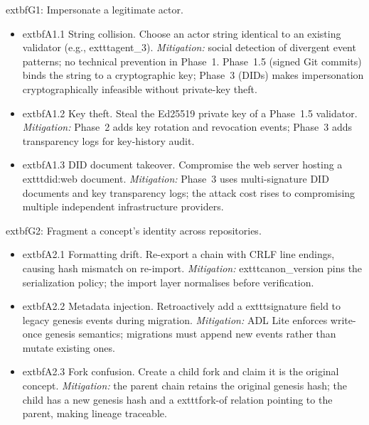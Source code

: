 	extbf{G1: Impersonate a legitimate actor.}
\begin{itemize}[leftmargin=2em]
    \item 	extbf{A1.1 String collision.} Choose an actor string identical to an existing validator (e.g., 	exttt{agent\_3}). \emph{Mitigation:} social detection of divergent event patterns; no technical prevention in Phase~1. Phase~1.5 (signed Git commits) binds the string to a cryptographic key; Phase~3 (DIDs) makes impersonation cryptographically infeasible without private-key theft.
    \item 	extbf{A1.2 Key theft.} Steal the Ed25519 private key of a Phase~1.5 validator. \emph{Mitigation:} Phase~2 adds key rotation and revocation events; Phase~3 adds transparency logs for key-history audit.
    \item 	extbf{A1.3 DID document takeover.} Compromise the web server hosting a 	exttt{did:web} document. \emph{Mitigation:} Phase~3 uses multi-signature DID documents and key transparency logs; the attack cost rises to compromising multiple independent infrastructure providers.
\end{itemize}

	extbf{G2: Fragment a concept's identity across repositories.}
\begin{itemize}[leftmargin=2em]
    \item 	extbf{A2.1 Formatting drift.} Re-export a chain with CRLF line endings, causing hash mismatch on re-import. \emph{Mitigation:} 	exttt{canon\_version} pins the serialization policy; the import layer normalises before verification.
    \item 	extbf{A2.2 Metadata injection.} Retroactively add a 	exttt{signature} field to legacy genesis events during migration. \emph{Mitigation:} ADL Lite enforces write-once genesis semantics; migrations must append new events rather than mutate existing ones.
    \item 	extbf{A2.3 Fork confusion.} Create a child fork and claim it is the original concept. \emph{Mitigation:} the parent chain retains the original genesis hash; the child has a new genesis hash and a 	exttt{fork-of} relation pointing to the parent, making lineage traceable.
\end{itemize}

